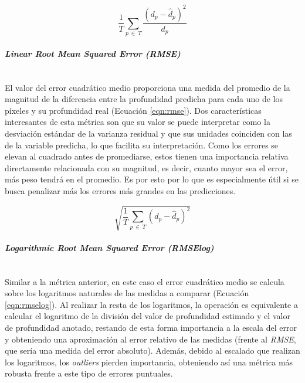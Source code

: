 \begin{equation}
\label{eqn:sq_rel}
\frac{1}{T}\sum_{p\ \in\ T} \frac{(d_p - \hat{d}_p)^2}{d_p}
\end{equation}

\paragraph{\textit{Linear Root Mean Squared Error (RMSE)}}\mbox{}\\
El valor del error cuadrático medio proporciona una medida del promedio de la magnitud de la diferencia entre la profundidad predicha para cada uno de los píxeles y su profundidad real (Ecuación \ref{eqn:rmse}). Dos características interesantes de esta métrica son que su valor se puede interpretar  como la desviación estándar de la varianza residual y que sus unidades coinciden con las de la variable predicha, lo que facilita su interpretación. Como los errores se elevan al cuadrado antes de promediarse, estos tienen una importancia relativa directamente relacionada con su magnitud, es decir, cuanto mayor sea el error, más peso tendrá en el promedio. Es por esto por lo que es especialmente útil si se busca penalizar más los errores más grandes en las predicciones.

\begin{equation}
\label{eqn:rmse}
\sqrt{\frac{1}{T}\sum_{p\ \in\ T} (d_p - \hat{d}_p)^2}
\end{equation}

\paragraph{\textit{Logarithmic Root Mean Squared Error (RMSElog)}}\mbox{}\\
Similar a la métrica anterior, en este caso el error cuadrático medio se calcula sobre los logaritmos naturales de las medidas a comparar (Ecuación \ref{eqn:rmselog}). Al realizar la resta de los logaritmos, la operación es equivalente a calcular el logaritmo de la división del valor de profundidad estimado y el valor de profundidad anotado, restando de esta forma importancia a la escala del error y obteniendo una aproximación al error relativo de las medidas (frente al \textit{RMSE}, que sería una medida del error absoluto). Además, debido al escalado que realizan los logaritmos, los \textit{outliers} pierden importancia, obteniendo así una métrica más robusta frente a este tipo de errores puntuales.

